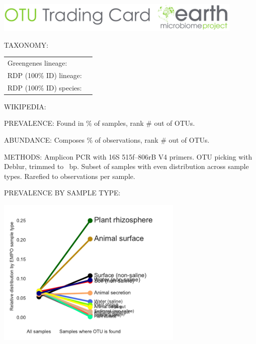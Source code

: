 \documentclass[10pt]{amsart}
\begin{document}
\begin{framed} %

\vspace{-6mm}

\begin{center}
\includegraphics[width=12cm]{emp_logo.pdf}
\end{center}

\begin{hangparas}{5.5em}{0}
\texttt{\sequence{}}
\end{hangparas}

\begin{raggedright}
\begin{hangparas}{2em}{1}
    TAXONOMY:   
    
    \begin{small}
    \begin{tabular}{@{} R{3.5cm} @{ } L{11cm}}
    Greengenes lineage: & \taxonomyGG{} \\
    RDP (100\% ID) lineage: & \taxonomyRDP{} \\
    RDP (100\% ID) species: & \speciesA{} \speciesB{} \speciesC{} \\
    \end{tabular}
	\end{small}

    WIKIPEDIA:  \wikipedia{}

    PREVALENCE: Found in \prevalencePercent{}\% of samples,
                rank \#\prevalenceRank{} out of \numOTUs{} OTUs.

    ABUNDANCE:  Composes \abundancePercent{}\% of observations,
                rank \#\abundanceRank{} out of \numOTUs{} OTUs.
            
    METHODS:    Amplicon PCR with 16S 515f--806rB V4 primers.
                OTU picking with Deblur, trimmed to \trimLength{}~bp.
                Subset of \numSamples{} samples with even distribution across sample types.
                Rarefied to \rarefactionDepth{} observations per sample.

\end{hangparas}

PREVALENCE BY SAMPLE TYPE:

\includegraphics[width=9cm]{point.pdf}


\end{raggedright}
\end{framed}
\end{document}
